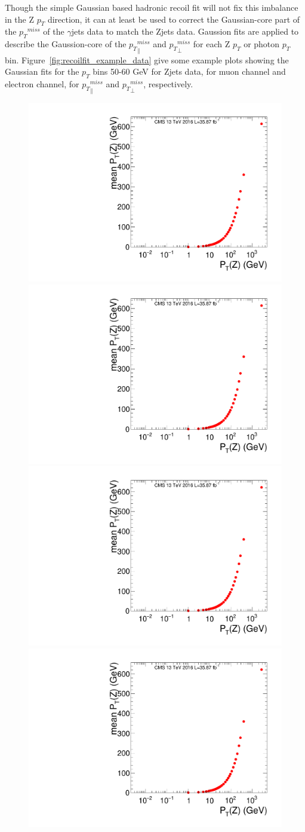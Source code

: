\vspace{0.3cm}
Though the simple Gaussian based hadronic recoil fit will not fix this imbalance in the Z $p_T$ direction, it can at least be used to correct the Gaussian-core part of the ${p_{T}}^{miss}$ of the $\gamma$jets data to match the Zjets data. Gaussion fits are applied to describe the Gaussion-core of the ${p_{T}}^{miss}_\parallel$ and ${p_{T}}^{miss}_\perp$ for each Z $p_T$ or photon $p_T$ bin. Figure~\ref{fig:recoilfit_example_data} give some example plots showing the Gaussian fits for the $p_T$ bins 50-60 GeV for Zjets data, for muon channel and electron channel, for ${p_{T}}^{miss}_\parallel$ and ${p_{T}}^{miss}_\perp$, respectively.
\begin{figure}[htbp]
\begin{center}
\includegraphics[width=0.46\linewidth, page=21]{figures/SingleEMU_Run2016Full_03Feb2017_allcorV2_met_para_study_ZSelecLowLPt_mu.pdf}
\includegraphics[width=0.46\linewidth, page=56]{figures/SingleEMU_Run2016Full_03Feb2017_allcorV2_met_para_study_ZSelecLowLPt_mu.pdf}
\includegraphics[width=0.46\linewidth, page=21]{figures/SingleEMU_Run2016Full_03Feb2017_allcorV2_met_para_study_ZSelecLowLPt_el.pdf}
\includegraphics[width=0.46\linewidth, page=21]{figures/SingleEMU_Run2016Full_03Feb2017_allcorV2_met_para_study_ZSelecLowLPt_el.pdf}

\end{center}
\end{figure}
